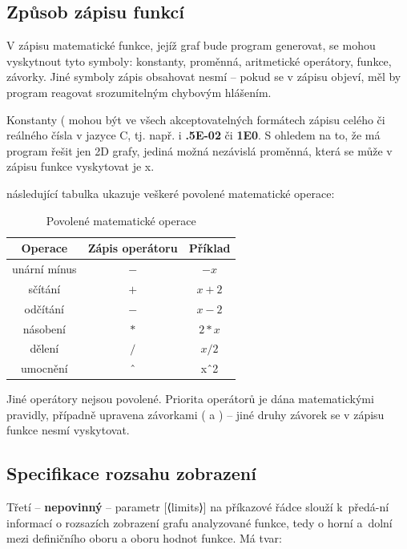 \documentclass[../main.tex]{subfiles}
\begin{document}
\newpage

\subsection{Způsob zápisu funkcí}
V zápisu matematické funkce, jejíž graf bude program generovat, se mohou vyskytnout tyto symboly: konstanty, proměnná, aritmetické operátory, funkce, závorky. Jiné symboly zápis obsahovat nesmí – pokud se v zápisu objeví, měl by program reagovat srozumitelným chybovým hlášením.
\vspace{0.5em}

Konstanty ( mohou být ve všech akceptovatelných formátech zápisu celého či reálného čísla
v jazyce C, tj. např. i \textbf{.5E-02} či \textbf{1E0}. S ohledem na to, že má program řešit jen 2D grafy, jediná
možná nezávislá proměnná, která se může v zápisu funkce vyskytovat je x.
\vspace{0.5em}

následující tabulka ukazuje veškeré povolené matematické operace:
\begin{table}[h!]
    \centering
    \begin{tabular}{|c|c|c|}
        \hline
        \textbf{Operace} & \textbf{Zápis operátoru} & \textbf{Příklad} \\ \hline
        unární mínus & $-$ & $-x$ \\ \hline
        sčítání & $+$ & $x + 2$ \\ \hline
        odčítání & $-$ & $x - 2$ \\ \hline
        násobení & $*$ & $2 * x$ \\ \hline
        dělení & $/$ & $x / 2$ \\ \hline
        umocnění & ˆ & xˆ2 \\ \hline
    \end{tabular}
    \caption{Povolené matematické operace}
\end{table}

Jiné operátory nejsou povolené. Priorita operátorů je dána matematickými pravidly, případně
upravena závorkami ( a ) – jiné druhy závorek se v zápisu funkce nesmí vyskytovat.

\subsection{Specifikace rozsahu zobrazení}
Třetí – \textbf{nepovinný} – parametr [⟨limits⟩] na příkazové řádce slouží k~předá-ní informací o rozsazích zobrazení grafu analyzované funkce, tedy o horní a~dolní mezi definičního oboru a oboru
hodnot funkce. Má tvar:
\vspace{0.5em}
\end{document}
